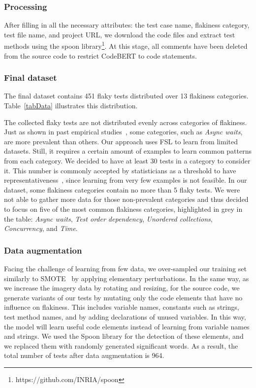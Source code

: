 \subsubsection{Processing}
After filling in all the necessary attributes: the test case name, flakiness category, test file name, and project URL, we download the code files and extract test methods using the spoon library\footnote{https://github.com/INRIA/spoon}. At this stage, all comments have been deleted from the source code to restrict CodeBERT to code statements.

\subsubsection{Final dataset}

The final dataset contains 451 flaky tests distributed over 13 flakiness categories.
Table~\ref{tabData} illustrates this distribution.

The collected flaky tests are not distributed evenly across categories of flakiness. Just as shown in past empirical studies~\cite{Luo2014,Gruber2021}, some categories, such as \textit{Async waits}, are more prevalent than others. 
Our approach uses FSL to learn from limited datasets. 
Still, it requires a certain amount of examples to learn common patterns from each category. 
We decided to have at least 30 tests in a category to consider it. This number is commonly accepted by statisticians as a threshold to have representativeness~\cite{why30}, since learning from very few examples is not feasible. In our dataset, some flakiness categories contain no more than 5 flaky tests. We were not able to gather more data for those non-prevalent categories and thus decided to focus on five of the most common flakiness categories, highlighted in grey in the table: \textit{Async waits}, \textit{Test order dependency}, \textit{Unordered collections}, \textit{Concurrency}, and \textit{Time}.


\subsubsection{Data augmentation}
Facing the challenge of learning from few data, we over-sampled our training set similarly to SMOTE~\cite{chawla2002smote} by applying elementary perturbations. In the same way, as we increase the imagery data by rotating and resizing, for the source code, we generate variants of our tests by mutating only the code elements that have no influence on flakiness. This includes variable names, constants such as strings, test method names, and by adding declarations of unused variables. In this way, the model will learn useful code elements instead of learning from variable names and strings. We used the Spoon library for the detection of these elements, and we replaced them with randomly generated significant words. As a result, the total number of tests after data augmentation is 964. 


